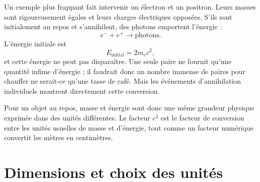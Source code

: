 Un exemple plus frappant fait intervenir un électron et un positron. Leurs masses sont rigoureusement égales et leurs charges électriques opposées. S’ils sont initialement au repos et s’annihilent, des photons emportent l’énergie :
\begin{equation}
e^-+e^+\longrightarrow \text{photons}.
\end{equation}
L’énergie initiale est
\begin{equation}
E_{\mathrm{initial}}=2m_e c^2,
\end{equation}
et cette énergie ne peut pas disparaître. Une seule paire ne fournit qu’une quantité infime d’énergie ; il faudrait donc un nombre immense de paires pour chauffer ne serait-ce qu’une tasse de café. Mais les événements d’annihilation individuels montrent directement cette conversion.

Pour un objet au repos, masse et énergie sont donc une même grandeur physique exprimée dans des unités différentes. Le facteur \(c^2\) est le facteur de conversion entre les unités usuelles de masse et d’énergie, tout comme un facteur numérique convertit les mètres en centimètres.

\begin{classroomqa}\end{classroomqa}

\section{Dimensions et choix des unités}

